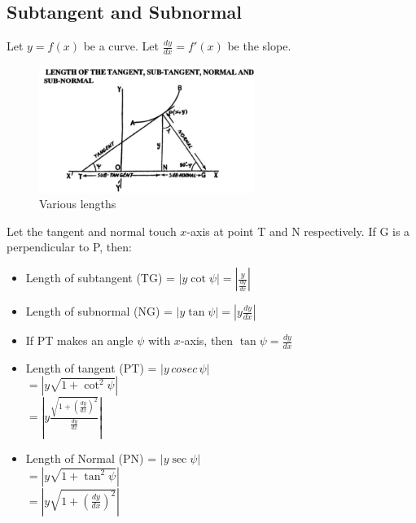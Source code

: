 \documentclass[11pt,a4paper,landscape]{article}
\begin{document}
\begin{multicols*}{2}
\section{Subtangent and Subnormal}
	Let $y=f(x)$ be a curve. Let $\frac{dy}{dx}=f'(x)$ be the slope.
	\begin{figure}[H]
		\centering
		\includegraphics[width=7cm]{P3}
		\caption{Various lengths}
	\end{figure}	
	Let the tangent and normal touch $x$-axis at point T and N respectively. If G is a perpendicular to P, then:
	\begin{itemize}
	\item Length of subtangent (TG) = $|y\cot\psi| = \left|\frac{y}{\frac{dy}{dx}}\right|$
	\item Length of subnormal (NG) = $|y\tan\psi| = \left|y\frac{dy}{dx}\right|$
	\item If PT makes an angle $\psi$ with $x$-axis, then $\tan\psi = \frac{dy}{dx}$
	\item Length of tangent (PT) = $|y\,cosec\,\psi|$\\[2mm]
	$= |y\sqrt{1+\cot^2{\psi}}|$\\[3mm]
	$= \left|y\frac{\sqrt{1+\left(\frac{dy}{dx}\right)^2}}{\frac{dy}{dx}}\right|$
	\item Length of Normal (PN) = $|y\sec{\psi}|$\\[2mm]
	$= |y\sqrt{1+\tan^2{\psi}}|$\\[3mm]
	$= \left|y\sqrt{1+\left(\frac{dy}{dx}\right)^2}\right|$
	\end{itemize}
\end{multicols*}
\end{document}
